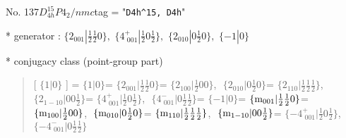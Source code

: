 \documentclass[fleqn,10pt,landscape]{jsarticle}
\begin{document}
\newpage

No. 137\quad$D_{4h}^{15}$\quad$P4_2/nmc$\quad[ tetragonal ]
tag = "{\tt D4h^15, D4h}"

* generator : $\{2{}_{001}|\frac{1}{2} \frac{1}{2} 0\},\,\,\{4^{+}_{\,\,001}|\frac{1}{2} 0 \frac{1}{2}\},\,\,\{2{}_{010}|0 \frac{1}{2} 0\},\,\,\{-1|0\}$

* conjugacy class (point-group part)
\begin{quote}
[ $\{1|0\}$ ] = \quad $\{1|0\}$ = \quad $\{2{}_{001}|\frac{1}{2} \frac{1}{2} 0\}$\newline[ $\{2{}_{100}|\frac{1}{2} 0 0\}$ ] = \quad $\{2{}_{100}|\frac{1}{2} 0 0\}$,\,\, $\{2{}_{010}|0 \frac{1}{2} 0\}$ = \quad $\{2{}_{110}|\frac{1}{2} \frac{1}{2} \frac{1}{2}\}$,\,\, $\{2{}_{1-10}|0 0 \frac{1}{2}\}$ = \quad $\{4^{+}_{\,\,001}|\frac{1}{2} 0 \frac{1}{2}\}$,\,\, $\{4^{-}_{\,\,001}|0 \frac{1}{2} \frac{1}{2}\}$\newline[ $\{-1|0\}$ ] = \quad $\{-1|0\}$ = \quad $\{{\rm m}_{001}|\frac{1}{2} \frac{1}{2} 0\}$\newline[ $\{{\rm m}_{100}|\frac{1}{2} 0 0\}$ ] = \quad $\{{\rm m}_{100}|\frac{1}{2} 0 0\}$,\,\, $\{{\rm m}_{010}|0 \frac{1}{2} 0\}$ = \quad $\{{\rm m}_{110}|\frac{1}{2} \frac{1}{2} \frac{1}{2}\}$,\,\, $\{{\rm m}_{1-10}|0 0 \frac{1}{2}\}$ = \quad $\{-4^{+}_{\,\,001}|\frac{1}{2} 0 \frac{1}{2}\}$,\,\, $\{-4^{-}_{\,\,001}|0 \frac{1}{2} \frac{1}{2}\}$\newline
\end{quote}
\end{document}
